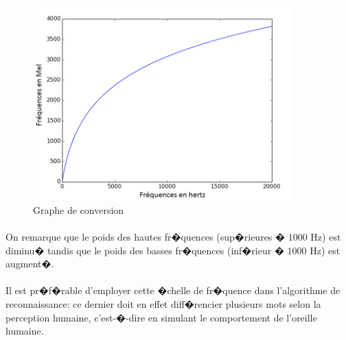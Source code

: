         	\begin{figure}[H]
						\begin{center}
							\includegraphics[width=10cm]{Images/Mel.png} 
						\end{center}
						\caption{Graphe de conversion}
			\end{figure}
        	\paragraph{}
        	On remarque que le poids des hautes fr�quences (sup�rieures � $1 000$ Hz) est diminu� tandis que le poids des basses fr�quences (inf�rieur � $1 000$ Hz) est augment�.
\paragraph{}
Il est pr�f�rable d'employer cette �chelle de fr�quence dans l'algorithme de reconnaissance: ce dernier doit en effet diff�rencier plusieurs mots selon la perception humaine, c'est-�-dire en simulant le comportement de l'oreille humaine.
